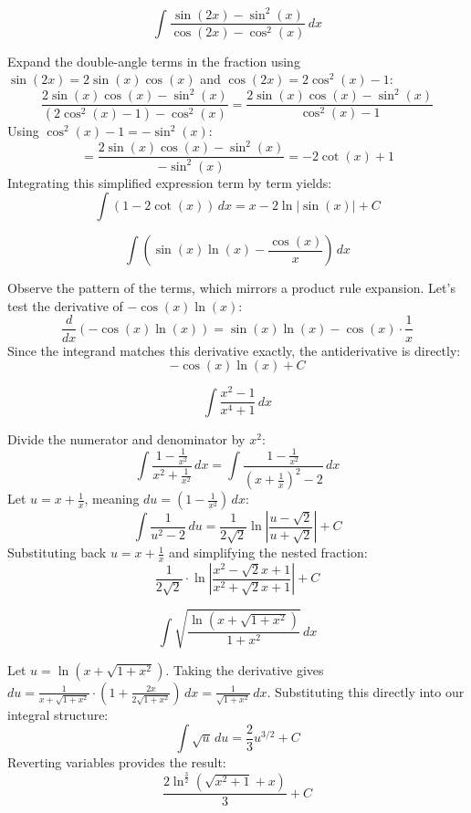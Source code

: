 \begin{questions}
    \question 
    \[ \int \frac{\sin(2x)-\sin^{2}(x)}{\cos(2x)-\cos^{2}(x)} \, dx \]
    \begin{solution}
        Expand the double-angle terms in the fraction using $\sin(2x) = 2\sin(x)\cos(x)$ and $\cos(2x) = 2\cos^2(x)-1$:
        \[ \frac{2\sin(x)\cos(x)-\sin^2(x)}{(2\cos^2(x)-1)-\cos^2(x)} = \frac{2\sin(x)\cos(x)-\sin^2(x)}{\cos^2(x)-1} \]
        Using $\cos^2(x)-1 = -\sin^2(x)$:
        \[ = \frac{2\sin(x)\cos(x)-\sin^2(x)}{-\sin^2(x)} = -2\cot(x) + 1 \]
        Integrating this simplified expression term by term yields:
        \[ \int (1 - 2\cot(x)) \, dx = x - 2\ln|\sin(x)| + C \]
    \end{solution}

    \question 
    \[ \int \left(\sin(x)\ln(x)-\frac{\cos(x)}{x}\right) \, dx \]
    \begin{solution}
        Observe the pattern of the terms, which mirrors a product rule expansion. Let's test the derivative of $-\cos(x)\ln(x)$:
        \[ \frac{d}{dx}\left(-\cos(x)\ln(x)\right) = \sin(x)\ln(x) - \cos(x) \cdot \frac{1}{x} \]
        Since the integrand matches this derivative exactly, the antiderivative is directly:
        \[ -\cos(x)\ln(x) + C \]
    \end{solution}

    \question 
    \[ \int \frac{x^{2}-1}{x^{4}+1} \, dx \]
    \begin{solution}
        Divide the numerator and denominator by $x^2$:
        \[ \int \frac{1 - \frac{1}{x^2}}{x^2 + \frac{1}{x^2}} \, dx = \int \frac{1 - \frac{1}{x^2}}{\left(x + \frac{1}{x}\right)^2 - 2} \, dx \]
        Let $u = x + \frac{1}{x}$, meaning $du = \left(1 - \frac{1}{x^2}\right) \, dx$:
        \[ \int \frac{1}{u^2-2} \, du = \frac{1}{2\sqrt{2}}\ln\left|\frac{u-\sqrt{2}}{u+\sqrt{2}}\right| + C \]
        Substituting back $u = x + \frac{1}{x}$ and simplifying the nested fraction:
        \[ \frac{1}{2\sqrt{2}}\cdot\ln\left|\frac{x^2-\sqrt{2}x+1}{x^2+\sqrt{2}x+1}\right| + C \]
    \end{solution}

    \question 
    \[ \int \sqrt{\frac{\ln\left(x+\sqrt{1+x^{2}}\right)}{1+x^{2}}} \, dx \]
    \begin{solution}
        Let $u = \ln\left(x+\sqrt{1+x^2}\right)$. Taking the derivative gives $du = \frac{1}{x+\sqrt{1+x^2}} \cdot \left(1 + \frac{2x}{2\sqrt{1+x^2}}\right) \, dx = \frac{1}{\sqrt{1+x^2}} \, dx$.
        Substituting this directly into our integral structure:
        \[ \int \sqrt{u} \, du = \frac{2}{3}u^{3/2} + C \]
        Reverting variables provides the result:
        \[ \frac{2\ln^{\frac{3}{2}}\left(\sqrt{x^2+1}+x\right)}{3} + C \]
    \end{solution}


\end{questions}
